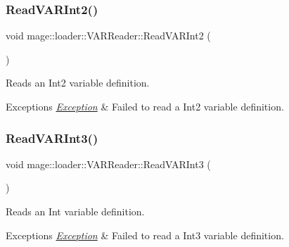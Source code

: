 \subsubsection{\texorpdfstring{Read\+V\+A\+R\+Int2()}{ReadVARInt2()}}
{\footnotesize\ttfamily void mage\+::loader\+::\+V\+A\+R\+Reader\+::\+Read\+V\+A\+R\+Int2 (\begin{DoxyParamCaption}{ }\end{DoxyParamCaption})\hspace{0.3cm}{\ttfamily [private]}}

Reads an Int2 variable definition.


\begin{DoxyExceptions}{Exceptions}
{\em \hyperlink{classmage_1_1_exception}{Exception}} & Failed to read a Int2 variable definition. \\
\hline
\end{DoxyExceptions}
\hypertarget{classmage_1_1loader_1_1_v_a_r_reader_a519dd541a8ee90bc83505d80e5dc1f49}{}\label{classmage_1_1loader_1_1_v_a_r_reader_a519dd541a8ee90bc83505d80e5dc1f49} 
\subsubsection{\texorpdfstring{Read\+V\+A\+R\+Int3()}{ReadVARInt3()}}
{\footnotesize\ttfamily void mage\+::loader\+::\+V\+A\+R\+Reader\+::\+Read\+V\+A\+R\+Int3 (\begin{DoxyParamCaption}{ }\end{DoxyParamCaption})\hspace{0.3cm}{\ttfamily [private]}}

Reads an Int variable definition.


\begin{DoxyExceptions}{Exceptions}
{\em \hyperlink{classmage_1_1_exception}{Exception}} & Failed to read a Int3 variable definition. \\
\hline
\end{DoxyExceptions}
\hypertarget{classmage_1_1loader_1_1_v_a_r_reader_a4ccc6a48ca72707853ff910362318940}{}\label{classmage_1_1loader_1_1_v_a_r_reader_a4ccc6a48ca72707853ff910362318940} 
